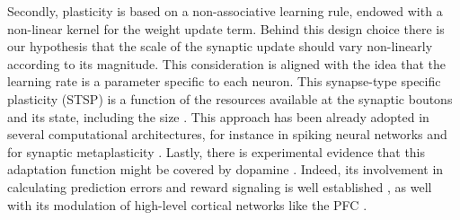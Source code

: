Secondly, plasticity is based on a non-associative learning rule, endowed with a non-linear kernel for the weight update term.
Behind this design choice there is our hypothesis that the scale of the synaptic update should vary non-linearly according to its magnitude.
This consideration is aligned with the idea that the learning rate is a parameter specific to each neuron. This synapse-type specific plasticity (STSP) \cite{larsenSynapsetypespecificPlasticityLocal2015} is a function of the resources available at the synaptic boutons and its state, including the size \cite{blackmanTargetcellspecificShorttermPlasticity2013, bartolHippocampalSpineHead2015, arielIntrinsicVariabilityPv2012}.
This approach has been already adopted in several computational architectures, for instance in spiking neural networks \cite{inglisModulationDopamineAdaptive2021} and for synaptic metaplasticity \cite{iigayaAdaptiveLearningDecisionmaking2016}.
Lastly, there is experimental evidence that this adaptation function might be covered by dopamine \cite{toblerAdaptiveCodingReward2005}.
Indeed, its involvement in calculating prediction errors and reward signaling is well established \cite{schultzNeuralSubstratePrediction1997}, as well with its modulation of  high-level cortical networks like the PFC \cite{didomenicoDopaminergicModulationPrefrontal2023, lohaniDopamineModulationPrefrontal2019, dardenneRolePrefrontalCortex2012}.


